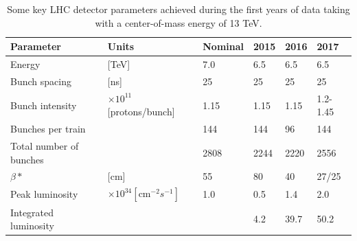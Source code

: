 \begin{table}[]
\begin{tabular}{| l | lllll |}
\hline
Parameter               & Units                                      & Nominal & 2015 & 2016 & 2017     \\
\hline
Energy                  & {[}TeV{]}                                  & 7.0     & 6.5  & 6.5  & 6.5      \\
Bunch spacing           & {[}ns{]}                                   & 25      & 25   & 25   & 25       \\
Bunch intensity         & $\times10^{11}${[}protons/bunch{]}         & 1.15    & 1.15 & 1.15 & 1.2-1.45 \\
Bunches per train       &                                            & 144     & 144  & 96   & 144      \\
Total number of bunches &                                            & 2808    & 2244 & 2220 & 2556     \\
$\beta*$                & {[}cm{]}                                   & 55      & 80   & 40   & 27/25    \\
Peak luminosity         & $\times 10^{34} [\textrm{cm}^{-2} s^{-1}]$ & 1.0     & 0.5  & 1.4  & 2.0      \\
Integrated luminosity   &                                            &         & 4.2  & 39.7 & 50.2     \\
\hline
\end{tabular}
\caption{Some key LHC detector parameters achieved during the first years of data taking with a center-of-mass energy of 13 TeV.}
\label{tab:LHCparameters}
\end{table}


